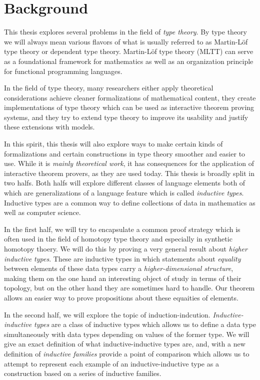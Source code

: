 \section{Background}

This thesis explores several problems in the field of \emph{type theory}.
By type theory we will always mean various flavors of what is usually
referred to as Martin-Löf type theory or dependent type theory.
Martin-Löf type theory (MLTT) can serve as a foundational framework for
mathematics as well as an organization principle for functional programming languages.

In the field of type theory, many researchers either apply theoretical considerations
achieve cleaner formalizations of mathematical content,
they create implementations of type theory which can be used as
interactive theorem proving systems, and they try to extend type
theory to improve its usability and justify these extensions with models.

In this spirit, this thesis will also explore ways to make certain kinds of formalizations
and certain constructions in type theory smoother and easier to use.
While it is \emph{mainly theoretical work}, it has consequences for the application of
interactive theorem provers, as they are used today.
This thesis is broadly split in two halfs.
Both halfs will explore different classes of language elements both of which are generalizations
of a language feature which is
called \emph{inductive types}.
Inductive types are a common way to define collections of data in mathematics
as well as computer science.

In the first half, we will try to encapsulate a common proof strategy which
is often used in the field of homotopy type theory and especially in
synthetic homotopy thoery.
We will do this by
proving a very general result about \emph{higher inductive types}.
These are inductive types in which statements about \emph{equality} between
elements of these data types carry a \emph{higher-dimensional structure},
making them on the one hand an interesting object of study in terms of their topology,
but on the other hand they are sometimes hard to handle.
Our theorem allows an easier way to prove propositions about these
equaities of elements.

In the second half, we will explore the topic of induction-indcution.
\emph{Inductive-inductive types} are a class of inductive types which
allows us to define a data type simultaneously with data types depending on
values of the former type.
We will give an exact definition of what inductive-inductive types are,
and, with a new definition of \emph{inductive families} provide a point of
comparison which allows us to attempt to represent each example of
an inductive-inductive type as a construction based on a series of
inductive families.

